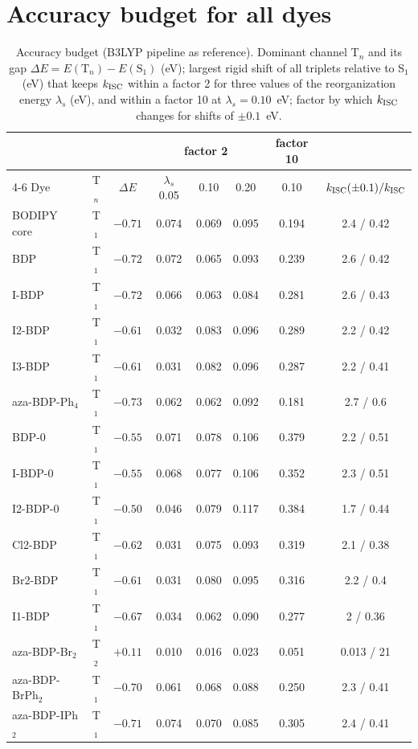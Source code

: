 \section{Accuracy budget for all dyes}
\begin{table}
  \caption{Accuracy budget (B3LYP pipeline as reference). Dominant channel T$_n$ and its gap
  $\Delta E=E(\mathrm{T}_n)-E(\mathrm{S}_1)$ (eV); largest rigid shift of all triplets relative to S$_1$ (eV) that keeps
  $k_\mathrm{ISC}$ within a factor 2 for three values of the reorganization energy $\lambda_s$ (eV), and within a factor 10
  at $\lambda_s=0.10$~eV; factor by which $k_\mathrm{ISC}$ changes for shifts of $\pm0.1$~eV.}
  \label{tab:allbudget}
  \small
  \begin{tabular}{lccccccc}
    \toprule
    & & & \multicolumn{3}{c}{factor 2} & factor 10 & \\
    \cmidrule(lr){4-6}
    Dye & T$_n$ & $\Delta E$ & $\lambda_s$ 0.05 & 0.10 & 0.20 & 0.10 & $k_\mathrm{ISC}(\pm0.1)/k_\mathrm{ISC}$ \\
    \midrule
    BODIPY core & T$_1$ & $-0.71$ & 0.074 & 0.069 & 0.095 & 0.194 & 2.4 / 0.42 \\
    BDP & T$_1$ & $-0.72$ & 0.072 & 0.065 & 0.093 & 0.239 & 2.6 / 0.42 \\
    I-BDP & T$_1$ & $-0.72$ & 0.066 & 0.063 & 0.084 & 0.281 & 2.6 / 0.43 \\
    I2-BDP & T$_1$ & $-0.61$ & 0.032 & 0.083 & 0.096 & 0.289 & 2.2 / 0.42 \\
    I3-BDP & T$_1$ & $-0.61$ & 0.031 & 0.082 & 0.096 & 0.287 & 2.2 / 0.41 \\
    aza-BDP-Ph$_4$ & T$_1$ & $-0.73$ & 0.062 & 0.062 & 0.092 & 0.181 & 2.7 / 0.6 \\
    BDP-0 & T$_1$ & $-0.55$ & 0.071 & 0.078 & 0.106 & 0.379 & 2.2 / 0.51 \\
    I-BDP-0 & T$_1$ & $-0.55$ & 0.068 & 0.077 & 0.106 & 0.352 & 2.3 / 0.51 \\
    I2-BDP-0 & T$_1$ & $-0.50$ & 0.046 & 0.079 & 0.117 & 0.384 & 1.7 / 0.44 \\
    \midrule
    Cl2-BDP & T$_1$ & $-0.62$ & 0.031 & 0.075 & 0.093 & 0.319 & 2.1 / 0.38 \\
    Br2-BDP & T$_1$ & $-0.61$ & 0.031 & 0.080 & 0.095 & 0.316 & 2.2 / 0.4 \\
    I1-BDP & T$_1$ & $-0.67$ & 0.034 & 0.062 & 0.090 & 0.277 & 2 / 0.36 \\
    aza-BDP-Br$_2$ & T$_2$ & $+0.11$ & 0.010 & 0.016 & 0.023 & 0.051 & 0.013 / 21 \\
    aza-BDP-BrPh$_2$ & T$_1$ & $-0.70$ & 0.061 & 0.068 & 0.088 & 0.250 & 2.3 / 0.41 \\
    aza-BDP-IPh$_2$ & T$_1$ & $-0.71$ & 0.074 & 0.070 & 0.085 & 0.305 & 2.4 / 0.41 \\
    \bottomrule
  \end{tabular}
\end{table}

